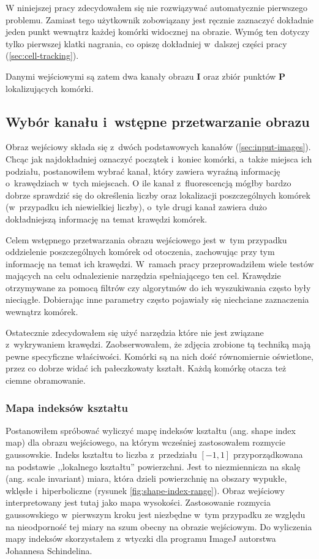 \documentclass[declaration,shortabstract,mgr]{iithesis}
\newcommand{\image}{\mathbf{I}}
\begin{document}
W niniejszej pracy zdecydowałem się nie rozwiązywać automatycznie pierwszego problemu.
Zamiast tego użytkownik zobowiązany jest ręcznie zaznaczyć dokładnie jeden punkt wewnątrz każdej komórki widocznej na obrazie.
Wymóg ten dotyczy tylko pierwszej klatki nagrania, co opiszę dokładniej w~dalszej części pracy (\ref{sec:cell-tracking}).

Danymi wejściowymi są zatem dwa kanały obrazu $\image$ oraz zbiór punktów $\mathbf{P}$ lokalizujących komórki.

\subsection{Wybór kanału i~wstępne przetwarzanie obrazu}

Obraz wejściowy składa się z~dwóch podstawowych kanałów (\ref{sec:input-images}).
Chcąc jak najdokładniej oznaczyć początek i~koniec komórki, a~także miejsca ich podziału, postanowiłem wybrać kanał, który zawiera wyraźną informację o~krawędziach w~tych miejscach.
O ile kanał z~fluorescencją mógłby bardzo dobrze sprawdzić się do określenia liczby oraz lokalizacji poszczególnych komórek (w~przypadku ich niewielkiej liczby), o~tyle drugi kanał zawiera dużo dokładniejszą informację na temat krawędzi komórek.

Celem wstępnego przetwarzania obrazu wejściowego jest w~tym przypadku oddzielenie poszczególnych komórek od otoczenia, zachowując przy tym informację na temat ich krawędzi. W~ramach pracy przeprowadziłem wiele testów mających na celu odnalezienie narzędzia spełniającego ten cel. Krawędzie otrzymywane za pomocą filtrów czy algorytmów do ich wyszukiwania często były nieciągłe. Dobierając inne parametry często pojawiały się niechciane zaznaczenia wewnątrz komórek.

Ostatecznie zdecydowałem się użyć narzędzia które nie jest związane z~wykrywaniem krawędzi. Zaobserwowałem, że zdjęcia zrobione tą techniką mają pewne specyficzne właściwości. Komórki są na nich dość równomiernie oświetlone, przez co dobrze widać ich pałeczkowaty kształt. Każdą komórkę otacza też ciemne obramowanie.

\subsubsection{Mapa indeksów kształtu}

Postanowiłem spróbować wyliczyć mapę indeksów kształtu\cite{paper:shape-index} (ang. shape index map) dla obrazu wejściowego, na którym wcześniej zastosowałem rozmycie gaussowskie. Indeks kształtu to liczba z~przedziału $[-1, 1]$ przyporządkowana na podstawie ,,lokalnego kształtu'' powierzchni. Jest to niezmiennicza na skalę (ang. scale invariant) miara, która dzieli powierzchnię na obszary wypukłe, wklęsłe i~hiperboliczne (rysunek \ref{fig:shape-index-range}). Obraz wejściowy interpretowany jest tutaj jako mapa wysokości. Zastosowanie rozmycia gaussowskiego w~pierwszym kroku jest niezbędne w~tym przypadku ze względu na nieodporność tej miary na szum obecny na obrazie wejściowym. Do wyliczenia mapy indeksów skorzystałem z~wtyczki dla programu ImageJ autorstwa Johannesa Schindelina\cite{plugin:shape-index-map}.
\end{document}
